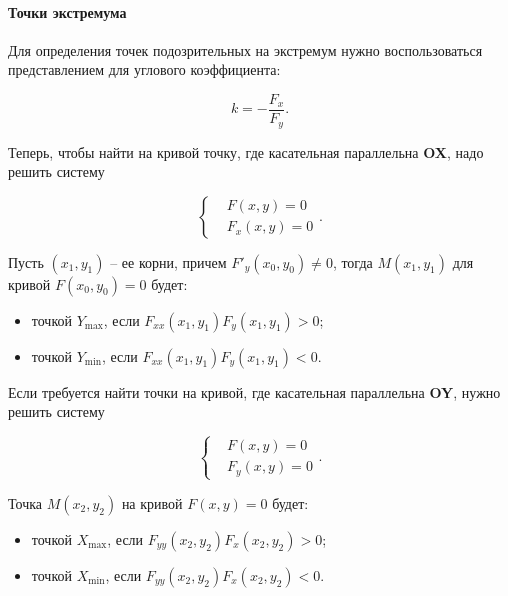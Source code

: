 			\paragraph{Точки экстремума}

				Для определения точек подозрительных на экстремум нужно  воспользоваться представлением для углового коэффициента:

				\begin{equation}
					k = - \frac{F_{x}}{F_{y}}.
				\end{equation}

				Теперь, чтобы найти на кривой точку, где касательная параллельна \textbf{OX}, надо решить систему

				\begin{equation}
					\begin{cases}
						& F \left( x, y \right) = 0\\
						& F_{x} \left( x, y \right) = 0
					\end{cases}.
				\end{equation}

				Пусть $\left( x_{1}, y_{1} \right)$ -- ее корни, причем $F'_{y} \left( x_{0}, y_{0} \right) \neq 0$, тогда $M \left( x_{1}, y_{1} \right)$ для кривой $F \left( x_{0}, y_{0} \right) = 0$ будет:

				\begin{itemize}
					\item точкой $Y_{\max}$, если $F_{xx} \left( x_{1}, y_{1} \right) F_{y} \left( x_{1}, y_{1} \right) > 0$;

					\item точкой $Y_{\min}$, если $F_{xx} \left( x_{1}, y_{1} \right) F_{y} \left( x_{1}, y_{1} \right) < 0$.
				\end{itemize}

				Если требуется найти точки на кривой, где касательная параллельна \textbf{OY}, нужно решить систему

				\begin{equation}
					\begin{cases}
						& F \left( x, y \right) = 0\\
						& F_{y} \left( x, y \right) = 0
					\end{cases}.
				\end{equation}

				Точка $M \left( x_{2}, y_{2} \right)$ на кривой $F \left( x, y \right) = 0$ будет:

				\begin{itemize}
					\item точкой $X_{\max}$, если $F_{yy} \left( x_{2}, y_{2} \right) F_{x} \left( x_{2}, y_{2} \right) > 0$;
					
					\item точкой $X_{\min}$, если $F_{yy} \left( x_{2}, y_{2} \right) F_{x} \left( x_{2}, y_{2} \right) < 0$.
				\end{itemize} 

